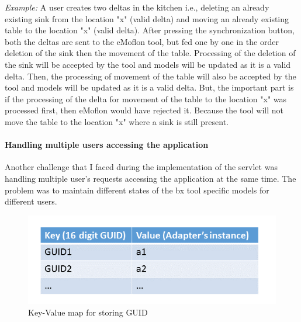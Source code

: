\textit{Example:} A user creates two deltas in the kitchen i.e., deleting an already existing sink from the location "x" (valid delta) and moving an already existing table to the location "x" (valid delta). After pressing the synchronization button, both the deltas are sent to the eMoflon tool, but fed one by one in the order deletion of the sink then the movement of the table. Processing of the deletion of the sink will be accepted by the tool and models will be updated as it is a valid delta. Then, the processing of movement of the table will also be accepted by the tool and models will be updated as it is a valid delta. But, the important part is if the processing of the delta for movement of the table to the location "x" was processed first, then eMoflon would have rejected it. Because the tool will not move the table to the location "x" where a sink is still present.

\paragraph{Handling multiple users accessing the application}
Another challenge that I faced during the implementation of the servlet was handling multiple user's requests accessing the application at the same time. The problem was to maintain different states of the bx tool specific models for different users. 

\begin{figure}
	\centering
	\includegraphics[width=1\textwidth]{figures/Keyvalue_map}
	\caption{Key-Value map for storing GUID}
	\label{fig:Keyvalue_map}
\end{figure}


